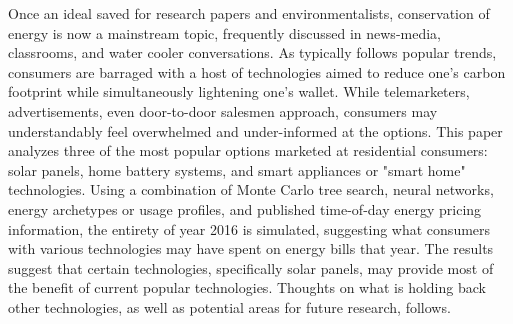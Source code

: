 \boldmath Once an ideal saved for research papers and environmentalists, conservation of energy is now a mainstream topic, frequently discussed in news-media, classrooms, and water cooler conversations. As typically follows popular trends, consumers are barraged with a host of technologies aimed to reduce one's carbon footprint while simultaneously lightening one's wallet. While telemarketers, advertisements, even door-to-door salesmen approach, consumers may understandably feel overwhelmed and under-informed at the options. This paper analyzes three of the most popular options marketed at residential consumers: solar panels, home battery systems, and smart appliances or "smart home" technologies. Using a combination of Monte Carlo tree search, neural networks, energy archetypes or usage profiles, and published time-of-day energy pricing information, the entirety of year 2016 is simulated, suggesting what consumers with various technologies may have spent on energy bills that year. The results suggest that certain technologies, specifically solar panels, may provide most of the benefit of current popular technologies. Thoughts on what is holding back other technologies, as well as potential areas for future research, follows.
